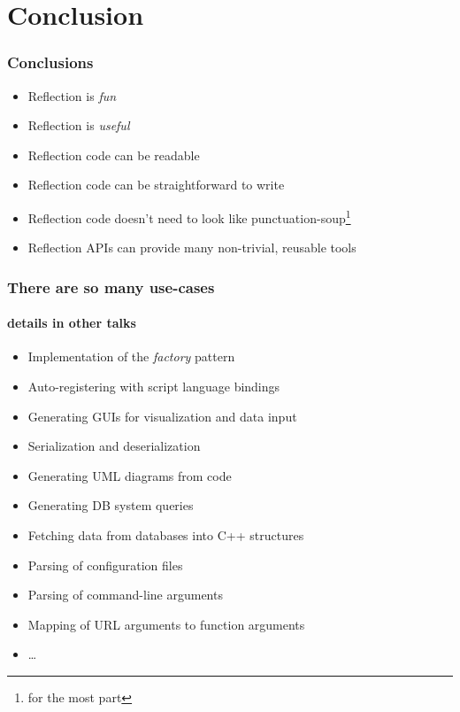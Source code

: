 \documentclass[compress,table,xcolor=table]{beamer}
\begin{document}
\section{Conclusion}
\begin{frame}
  \frametitle{Conclusions}
  \larger
  \begin{itemize}
    \item Reflection is {\em \larger fun}
    \item Reflection is {\em \larger useful}
    \item Reflection code can be readable
    \item Reflection code can be straightforward to write
    \item Reflection code doesn't need to look like punctuation-soup\footnote{
        for the most part}
    \item Reflection APIs can provide many non-trivial, reusable tools
  \end{itemize}
\end{frame}
\begin{frame}
  \frametitle{There are so many use-cases}
  \framesubtitle{details in other talks}
  \begin{itemize}
    \item Implementation of the {\em factory} pattern
    \item Auto-registering with script language bindings
    \item Generating GUIs for visualization and data input
    \item Serialization and deserialization
    \item Generating UML diagrams from code
    \item Generating DB system queries
    \item Fetching data from databases into C++ structures
    \item Parsing of configuration files
    \item Parsing of command-line arguments
    \item Mapping of URL arguments to function arguments
    \item \ldots
  \end{itemize}
\end{frame}
\end{document}

